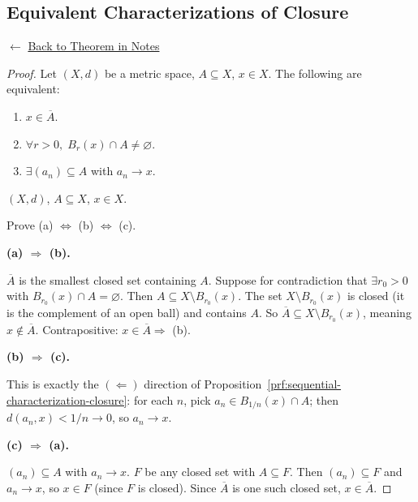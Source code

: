 
\subsection*{Equivalent Characterizations of Closure}
\label{prf:closure-equivalences}

\begin{remark*}[Return]
$\leftarrow$ \hyperref[thm:closure-equivalences]{Back to Theorem in Notes}
\end{remark*}

\begin{proof}
\Claim Let $(X,d)$ be a metric space, $A \subseteq X$, $x \in X$.
The following are equivalent:
\begin{enumerate}[label=(\alph*)]
  \item $x \in \overline{A}$.
  \item $\forall r > 0,\; B_r(x) \cap A \neq \varnothing$.
  \item $\exists (a_n) \subseteq A$ with $a_n \to x$.
\end{enumerate}

\Given $(X,d)$, $A \subseteq X$, $x \in X$.

\Goal Prove (a) $\Leftrightarrow$ (b) $\Leftrightarrow$ (c).

\medskip
\noindent\textbf{(a) $\Rightarrow$ (b).}

\ByDef $\overline{A}$ is the smallest closed set containing $A$.
Suppose for contradiction that $\exists r_0 > 0$ with $B_{r_0}(x) \cap A = \varnothing$.
Then $A \subseteq X \setminus B_{r_0}(x)$.
The set $X \setminus B_{r_0}(x)$ is closed (it is the complement of an open ball)
and contains $A$.
So $\overline{A} \subseteq X \setminus B_{r_0}(x)$, meaning $x \notin \overline{A}$.
Contrapositive: $x \in \overline{A} \Rightarrow$ (b).

\medskip
\noindent\textbf{(b) $\Rightarrow$ (c).}

This is exactly the $(\Leftarrow)$ direction of
Proposition~\ref{prf:sequential-characterization-closure}:
for each $n$, pick $a_n \in B_{1/n}(x) \cap A$;
then $d(a_n, x) < 1/n \to 0$, so $a_n \to x$.

\medskip
\noindent\textbf{(c) $\Rightarrow$ (a).}

\Let $(a_n) \subseteq A$ with $a_n \to x$.
\Let $F$ be any closed set with $A \subseteq F$.
Then $(a_n) \subseteq F$ and $a_n \to x$, so $x \in F$
(since $F$ is closed).
Since $\overline{A}$ is one such closed set, $x \in \overline{A}$. \AsReq
\end{proof}

